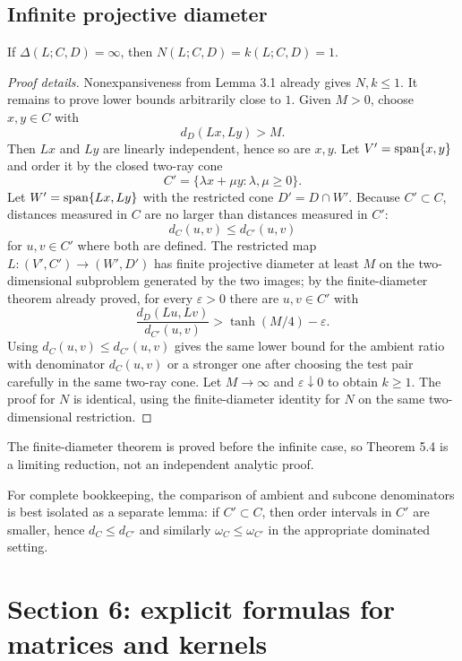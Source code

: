 \subsection{Infinite projective diameter}
\begin{theorem}
If $\Delta(L;C,D)=\infty$, then $N(L;C,D)=k(L;C,D)=1$.
\end{theorem}

\begin{proof}[Proof details]
Nonexpansiveness from Lemma 3.1 already gives $N,k\le1$.
It remains to prove lower bounds arbitrarily close to $1$.
Given $M>0$, choose $x,y\in C$ with
\[
  d_D(Lx,Ly)>M.
\]
Then $Lx$ and $Ly$ are linearly independent, hence so are $x,y$.
Let $V'=\operatorname{span}\{x,y\}$ and order it by the closed two-ray cone
\[
  C'=\{\lambda x+\mu y:\lambda,\mu\ge0\}.
\]
Let $W'=\operatorname{span}\{Lx,Ly\}$ with the restricted cone $D'=D\cap W'$.
Because $C'\subset C$, distances measured in $C$ are no larger than distances measured in $C'$:
\[
  d_C(u,v)\le d_{C'}(u,v)
\]
for $u,v\in C'$ where both are defined.
The restricted map $L: (V',C')\to(W',D')$ has finite projective diameter at least $M$ on the two-dimensional subproblem generated by the two images; by the finite-diameter theorem already proved, for every $\varepsilon>0$ there are $u,v\in C'$ with
\[
  \frac{d_D(Lu,Lv)}{d_{C'}(u,v)}
  >\tanh(M/4)-\varepsilon.
\]
Using $d_C(u,v)\le d_{C'}(u,v)$ gives the same lower bound for the ambient ratio with denominator $d_C(u,v)$ or a stronger one after choosing the test pair carefully in the same two-ray cone.
Let $M\to\infty$ and $\varepsilon\downarrow0$ to obtain $k\ge1$.
The proof for $N$ is identical, using the finite-diameter identity for $N$ on the same two-dimensional restriction.
\end{proof}

\begin{commentarynotes}
\item The finite-diameter theorem is proved before the infinite case, so Theorem 5.4 is a limiting reduction, not an independent analytic proof.
\item For complete bookkeeping, the comparison of ambient and subcone denominators is best isolated as a separate lemma: if $C'\subset C$, then order intervals in $C'$ are smaller, hence $d_C\le d_{C'}$ and similarly $\omega_C\le\omega_{C'}$ in the appropriate dominated setting.
\end{commentarynotes}

\section{Section 6: explicit formulas for matrices and kernels}


